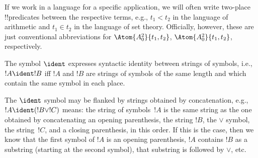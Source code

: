 \documentclass[../../../include/open-logic-section]{subfiles}
\begin{document}
If we work in a language for a specific application, we will often
write two-place !!{predicate}s between the
respective terms, e.g., $t_1 < t_2$ in the language
of arithmetic and $t_1 \in t_2$ in the language of set theory. Officially, however,
these are just conventional abbreviations for $\Atom{A^2_0}{t_1, t_2}$,
$\Atom{A^2_0}{t_1, t_2}%
$, respectively.

\begin{defn}
The symbol $\ident$ expresses syntactic identity between strings of
symbols, i.e., $!A \ident !B$ iff $!A$ and $!B$ are strings of symbols
of the same length and which contain the same symbol in each place.
\end{defn}

The $\ident$ symbol may be flanked by strings obtained by
concatenation, e.g., $!A \ident (!B \lor !C)$ means: the string of
symbols~$!A$ is the same string as the one obtained by concatenating
an opening parenthesis, the string $!B$, the $\lor$ symbol, the
string~$!C$, and a closing parenthesis, in this order. If this is the
case, then we know that the first symbol of $!A$ is an opening
parenthesis, $!A$ contains $!B$ as a substring (starting at the second
symbol), that substring is followed by $\lor$, etc.
\end{document}
